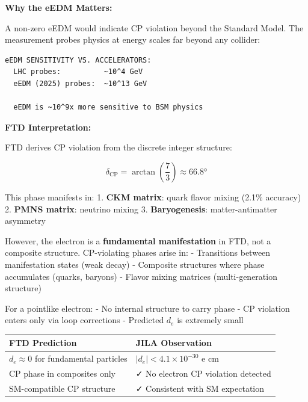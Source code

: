\documentclass[
  11pt,
  letterpaper,
  twoside,
  openany]{book}
\begin{document}
\textbf{Why the eEDM Matters:}

A non-zero eEDM would indicate CP violation beyond the Standard Model.
The measurement probes physics at energy scales far beyond any collider:

\begin{verbatim}
eEDM SENSITIVITY VS. ACCELERATORS:
  LHC probes:          ~10^4 GeV
  eEDM (2025) probes:  ~10^13 GeV

  eEDM is ~10^9x more sensitive to BSM physics
\end{verbatim}

\textbf{FTD Interpretation:}

FTD derives CP violation from the discrete integer structure:

\[\delta_{\text{CP}} = \arctan\left(\frac{7}{3}\right) \approx 66.8°\]

This phase manifests in: 1. \textbf{CKM matrix}: quark flavor mixing
(2.1\% accuracy) 2. \textbf{PMNS matrix}: neutrino mixing 3.
\textbf{Baryogenesis}: matter-antimatter asymmetry

However, the electron is a \textbf{fundamental manifestation} in FTD,
not a composite structure. CP-violating phases arise in: - Transitions
between manifestation states (weak decay) - Composite structures where
phase accumulates (quarks, baryons) - Flavor mixing matrices
(multi-generation structure)

For a pointlike electron: - No internal structure to carry phase - CP
violation enters only via loop corrections - Predicted \(d_e\) is
extremely small

\begin{longtable}[]{@{}
  >{\raggedright\arraybackslash}p{}
  >{\raggedright\arraybackslash}p{}@{}}
\toprule\noalign{}
\begin{minipage}[b]{\linewidth}\raggedright
FTD Prediction
\end{minipage} & \begin{minipage}[b]{\linewidth}\raggedright
JILA Observation
\end{minipage} \\
\midrule\noalign{}
\endhead
\bottomrule\noalign{}
\endlastfoot
\(d_e \approx 0\) for fundamental particles &
\(|d_e| < 4.1 \times 10^{-30}\) e cm \\
CP phase in composites only & ✓ No electron CP violation detected \\
SM-compatible CP structure & ✓ Consistent with SM expectation \\
\end{longtable}
\end{document}

